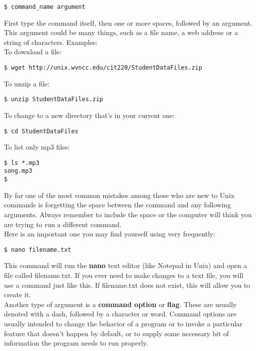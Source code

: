 \begin{verbatim}
$ command_name argument
\end{verbatim}

First type the command itself, then one or more spaces, followed by an argument.  This argument could be many things, such as a file name, a web address or a string of characters.  Examples:\\

To download a file:
\begin{verbatim}
$ wget http://unix.wvncc.edu/cit220/StudentDataFiles.zip
\end{verbatim}

To unzip a file:
\begin{verbatim}
$ unzip StudentDataFiles.zip
\end{verbatim}

To change to a new directory that's in your current one:
\begin{verbatim}
$ cd StudentDataFiles
\end{verbatim}

To list only mp3 files:
\begin{verbatim}
$ ls *.mp3
song.mp3
$
\end{verbatim}

By far one of the most common mistakes among those who are new to Unix commands is forgetting the space between the command and any following arguments.  Always remember to include the space or the computer will think you are trying to run a different command.\\

Here is an important one you may find yourself using very frequently:

\begin{verbatim}
$ nano filename.txt
\end{verbatim}

This command will run the \textbf{nano} text editor (like Notepad in Unix) and open a file called filename.txt.  If you ever need to make changes to a text file, you will use a command just like this.  If filename.txt does not exist, this will allow you to create it.\\

Another type of argument is a \textbf{command option} or \textbf{flag}.  These are usually denoted with a dash, followed by a character or word.  Command options are usually intended to change the behavior of a program or to invoke a particular feature that doesn't happen by default, or to supply some necessary bit of information the program needs to run properly.\\

